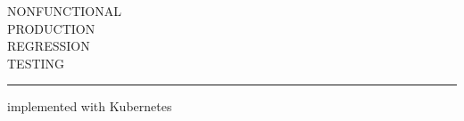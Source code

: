 \setmainfont[Path=fonts/FONT/]{FONT-Bold}
\begin{titlepage} %
\vspace*{\baselineskip} %
\begin{center}
{\LARGE \uppercase{Nonfunctional\\Production\\Regression\\Testing}}
\end{center}
\noindent\hfil\rule{0.5\textwidth}{.4pt}\hfil
\newline
\begin{center}
{\large implemented with Kubernetes}
\end{center}
\end{titlepage}
